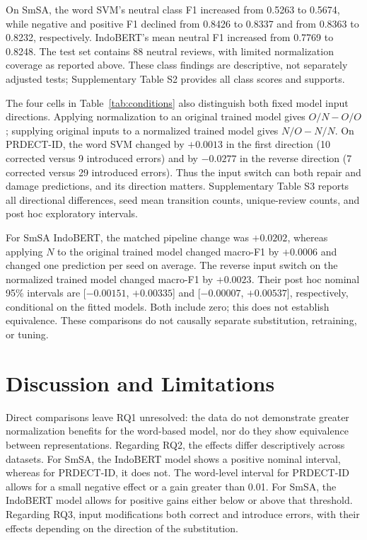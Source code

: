 On SmSA, the word SVM's neutral class F1 increased from 0.5263 to 0.5674, while negative and positive F1 declined from 0.8426 to 0.8337 and from 0.8363 to 0.8232, respectively. IndoBERT's mean neutral F1 increased from 0.7769 to 0.8248. The test set contains 88 neutral reviews, with limited normalization coverage as reported above. These class findings are descriptive, not separately adjusted tests; Supplementary Table S2 provides all class scores and supports.

The four cells in Table~\ref{tab:conditions} also distinguish both fixed model input directions. Applying normalization to an original trained model gives $O/N-O/O$; supplying original inputs to a normalized trained model gives $N/O-N/N$. On PRDECT-ID, the word SVM changed by $+0.0013$ in the first direction (10 corrected versus 9 introduced errors) and by $-0.0277$ in the reverse direction (7 corrected versus 29 introduced errors). Thus the input switch can both repair and damage predictions, and its direction matters. Supplementary Table S3 reports all directional differences, seed mean transition counts, unique-review counts, and post hoc exploratory intervals.

For SmSA IndoBERT, the matched pipeline change was $+0.0202$, whereas applying $N$ to the original trained model changed macro-F1 by $+0.0006$ and changed one prediction per seed on average. The reverse input switch on the normalized trained model changed macro-F1 by $+0.0023$. Their post hoc nominal 95\% intervals are [$-0.00151$, $+0.00335$] and [$-0.00007$, $+0.00537$], respectively, conditional on the fitted models. Both include zero; this does not establish equivalence. These comparisons do not causally separate substitution, retraining, or tuning.

\section{Discussion and Limitations}
Direct comparisons leave RQ1 unresolved: the data do not demonstrate greater normalization benefits for the word-based model, nor do they show equivalence between representations. Regarding RQ2, the effects differ descriptively across datasets. For SmSA, the IndoBERT model shows a positive nominal interval, whereas for PRDECT-ID, it does not. The word-level interval for PRDECT-ID allows for a small negative effect or a gain greater than 0.01. For SmSA, the IndoBERT model allows for positive gains either below or above that threshold. Regarding RQ3, input modifications both correct and introduce errors, with their effects depending on the direction of the substitution.


